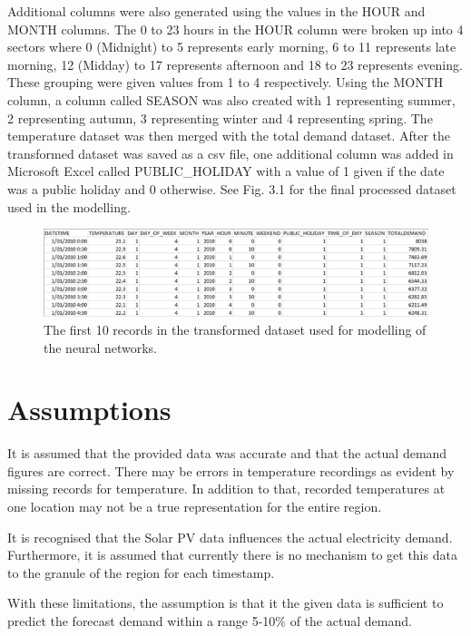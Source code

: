 \documentclass[mstat,12pt]{unswthesis}
\begin{document}
Additional columns were also generated using the values in the HOUR and
MONTH columns. The 0 to 23 hours in the HOUR column were broken up into
4 sectors where 0 (Midnight) to 5 represents early morning, 6 to 11
represents late morning, 12 (Midday) to 17 represents afternoon and 18
to 23 represents evening. These grouping were given values from 1 to 4
respectively. Using the MONTH column, a column called SEASON was also
created with 1 representing summer, 2 representing autumn, 3
representing winter and 4 representing spring. The temperature dataset
was then merged with the total demand dataset. After the transformed
dataset was saved as a csv file, one additional column was added in
Microsoft Excel called PUBLIC\_HOLIDAY with a value of 1 given if the
date was a public holiday and 0 otherwise. See Fig. 3.1 for the final
processed dataset used in the modelling.

\begin{figure}[H]
\includegraphics{first_10_records.png}
\caption{The first 10 records in the transformed dataset used for modelling of the neural networks.}\label{3.1}
\end{figure}

\hypertarget{assumptions}{%
\section{Assumptions}\label{assumptions}}

It is assumed that the provided data was accurate and that the actual
demand figures are correct. There may be errors in temperature
recordings as evident by missing records for temperature. In addition to
that, recorded temperatures at one location may not be a true
representation for the entire region.

\bigskip

It is recognised that the Solar PV data influences the actual
electricity demand. Furthermore, it is assumed that currently there is
no mechanism to get this data to the granule of the region for each
timestamp.

\bigskip

With these limitations, the assumption is that it the given data is
sufficient to predict the forecast demand within a range 5-10\% of the
actual demand.
\end{document}
